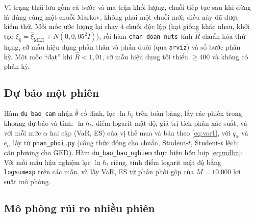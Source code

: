 \documentclass[12pt,a4paper]{article}
\theoremstyle{remark}
\newcommand{\Ncal}{N}
\newcommand{\ma}[1]{\texttt{\small #1}}
\begin{document}
Vì trạng thái lưu gồm cả bước và ma trận khối lượng, chuỗi tiếp tục sau khi dừng là đúng cùng một chuỗi Markov, không phải một chuỗi mới; điều này đã được kiểm thử. Mỗi mốc ước lượng lại chạy $4$ chuỗi độc lập (hạt giống khác nhau, khởi tạo $\xi_0=\hat\xi_{\text{MLE}}+\Ncal(0,0{,}05^2I)$), rồi hàm \ma{chan\_doan\_nuts} tính $\hat R$ chuẩn hóa thứ hạng, cỡ mẫu hiệu dụng phần thân và phần đuôi (qua \ma{arviz}) và số bước phân kỳ. Một mốc ``đạt'' khi $\hat R<1{,}01$, cỡ mẫu hiệu dụng tối thiểu $\ge400$ và không có phân kỳ.

\subsection{Dự báo một phiên}

Hàm \ma{du\_bao\_cam} nhận $\hat\theta$ cố định, lọc $\ln h_t$ trên toàn bảng, lấy các phiên trong khoảng dự báo và tính: $\ln h_t$, điểm logarit mật độ, giá trị tích phân xác suất, và với mỗi mức $\alpha$ hai cặp (VaR, ES) của vị thế mua và bán theo \eqref{eq:var1}, với $q_\alpha$ và $e_\alpha$ lấy từ \ma{phan\_phoi.py} (công thức đóng cho chuẩn, Student-$t$, Student-$t$ lệch; cầu phương cho GED). Hàm \ma{du\_bao\_hau\_nghiem} thực hiện hỗn hợp \eqref{eq:mdhn}: Với mỗi mẫu hậu nghiệm lọc $\ln h_t$ riêng, tính điểm logarit mật độ bằng \ma{logsumexp} trên các mẫu, và lấy VaR, ES từ phân phối gộp của $M=10.000$ lợi suất mô phỏng.

\subsection{Mô phỏng rủi ro nhiều phiên}
\end{document}
